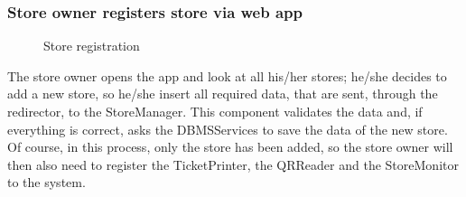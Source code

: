 \subsubsection{Store owner registers store via web app}
\begin{figure}[H]
	\noindent
	\caption{Store registration}
\end{figure}
The store owner opens the app and look at all his/her stores; he/she decides to add a new store, so he/she insert all required data, that are sent, through the redirector, to the StoreManager. This component validates the data and, if everything is correct, asks the DBMSServices to save the data of the new store.\\
Of course, in this process, only the store has been added, so the store owner will then also need to register the TicketPrinter, the QRReader and the StoreMonitor to the system.
